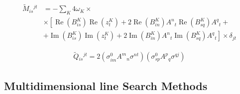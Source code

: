 \documentclass[aps,prl,reprint,amsmath,amssymb]{revtex4-1}
\begin{document}
%
\begin{equation} \label{eq:hessian-loc}
\begin{split}
\tilde{M}{_{is}}^{jt} &= - \sum_K {4 \omega_K} \times \\ 
&\times \left[  \operatorname{Re}(B^{K}_{is}) \operatorname{Re}(z_{t}^{K}) + 2 \operatorname{Re}(B^{K}_{in}){A^{n}}_{t} \operatorname{Re}(B^{K}_{sq}){A^{q}}_{t} +  \right. \\
&\left. + \operatorname{Im}(B^{K}_{is}) \operatorname{Im}(z_{t}^{K}) + 2 \operatorname{Im}(B^{K}_{in}){A^{n}}_{t} \operatorname{Im}(B^{K}_{sq}){A^{q}}_{t}  \right] \times \delta_{jt}
\end{split}
\end{equation}
%

%
\begin{equation} \label{eq:hessian-pen}
\begin{split}
\tilde{Q}{_{is}}^{jt} = 2\left(\sigma_{im}^0 {A^m}_n \sigma^{nt}\right)\left(\sigma_{sp}^0 {A^p}_q \sigma^{qj}\right)
\end{split}
\end{equation}
%



\subsection{Multidimensional line Search Methods}
\end{document}
